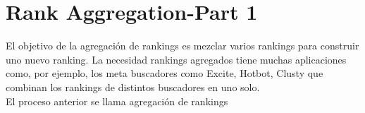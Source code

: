 \section{Rank Aggregation-Part 1 \cite{langville2012s}}

El objetivo de la agregación de rankings es mezclar varios rankings para construir uno nuevo ranking. La necesidad rankings agregados tiene muchas aplicaciones como, por ejemplo, los meta buscadores como Excite, Hotbot, Clusty que combinan los rankings de distintos buscadores en uno solo.\\

El proceso anterior se llama agregación de rankings 